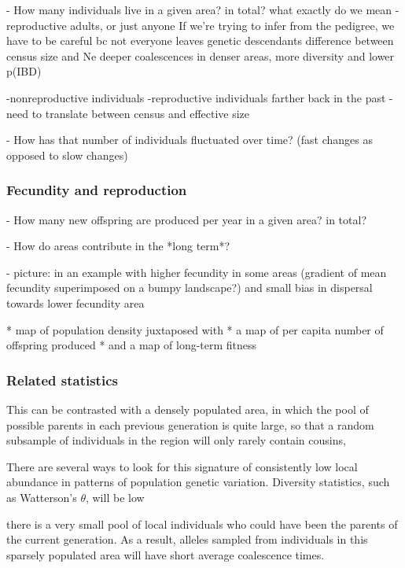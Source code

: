 \documentclass{ar-1col}
\begin{document}
        - How many individuals live in a given area? in total?
what exactly do we mean - reproductive adults, or just anyone
If we're trying to infer from the pedigree, we have to be careful bc not everyone leaves genetic descendants
difference between census size and Ne
deeper coalescences in denser areas, more diversity and lower p(IBD)

    -nonreproductive individuals
        -reproductive individuals farther back in the past
    -need to translate between census and effective size


        - How has that number of individuals fluctuated over time? (fast changes as opposed to slow changes)

\subsubsection{Fecundity and reproduction}
        - How many new offspring are produced per year in a given area? in total?

        - How do areas contribute in the *long term*?

        - picture:
            in an example with higher fecundity in some areas
            (gradient of mean fecundity superimposed on a bumpy landscape?)
            and small bias in dispersal towards lower fecundity area

            * map of population density juxtaposed with
            * a map of per capita number of offspring produced
            * and a map of long-term fitness
          

\subsubsection{Related statistics}

This can be contrasted with a densely populated area,
in which the pool of possible parents in each previous generation is quite large,
so that a random subsample of individuals in the region
will only rarely contain cousins,




There are several ways to look for this signature
of consistently low local abundance
in patterns of population genetic variation.
Diversity statistics, such as Watterson's $\theta$,
will be low



there is a very small pool of local individuals who could
have been the parents of the current generation.
As a result, alleles sampled from individuals in this sparsely populated area
will have short average coalescence times.
\end{document}

